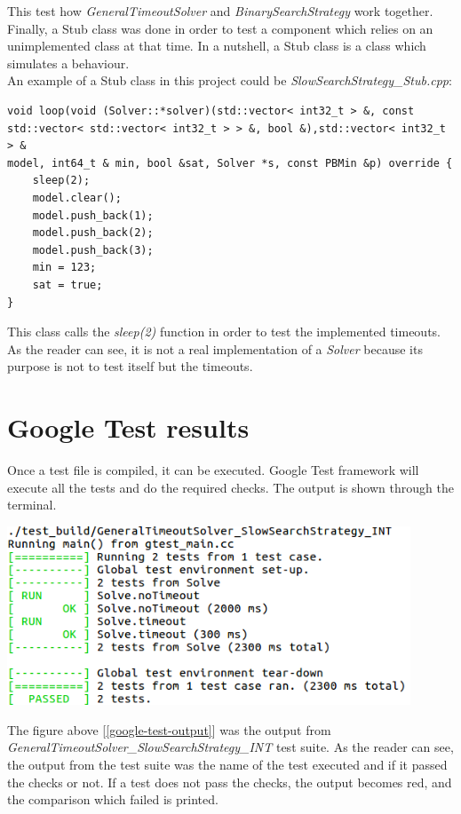 This test how \emph{GeneralTimeoutSolver} and \emph{BinarySearchStrategy} work together.\\
Finally, a Stub class was done in order to test a component which relies on an unimplemented class at that time. In a nutshell, a Stub class is a class which simulates a behaviour. \\
An example of a Stub class in this project could be \emph{SlowSearchStrategy\_Stub.cpp}:
\begin{verbatim}
void loop(void (Solver::*solver)(std::vector< int32_t > &, const
std::vector< std::vector< int32_t > > &, bool &),std::vector< int32_t > &
model, int64_t & min, bool &sat, Solver *s, const PBMin &p) override {
    sleep(2);
    model.clear();
    model.push_back(1);
    model.push_back(2);
    model.push_back(3);
    min = 123;
    sat = true;
}
\end{verbatim}
This class calls the \emph{sleep(2)} function in order to test the implemented timeouts. As the reader can see, it is not a real implementation of a \emph{Solver} because its purpose is not to test itself but the timeouts.

\section{Google Test results}
Once a test file is compiled, it can be executed. Google Test framework will execute all the tests and do the required checks. The output is shown through the terminal.
\begin{center}
	\includegraphics[width=0.9\textwidth]{Figures/google-test-output.png}
	\label{google-test-output}
\end{center}
The figure above [\ref{google-test-output}] was the output from \emph{GeneralTimeoutSolver\_SlowSearchStrategy\_INT} test suite. As the reader can see, the output from the test suite was the name of the test executed and if it passed the checks or not.  If a test does not pass the checks, the output becomes red, and the comparison which failed is printed. 